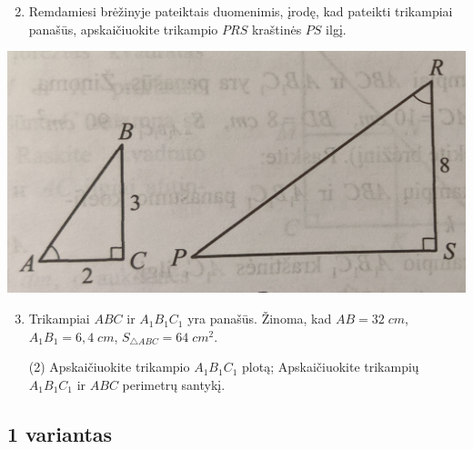 \documentclass[a4paper]{article}
\begin{document}
\begin{minipage}{0.5\textwidth}
      \begin{enumerate}
            \setcounter{enumi}{1} %
            \item Remdamiesi brėžinyje pateiktais duomenimis, įrodę, kad pateikti trikampiai
                  panašūs, apskaičiuokite trikampio $PRS$ kraštinės $PS$ ilgį.
      \end{enumerate}
      \begin{center}
            \includegraphics[scale=0.5]{images/triangle_2.png}
      \end{center}
\end{minipage}

\begin{enumerate}
      \setcounter{enumi}{2} %
      \item Trikampiai $ABC$ ir $A_1B_1C_1$ yra panašūs. Žinoma, kad $AB=32 \; cm$,
            $A_1B_1=6,4 \; cm$, $S_{\triangle ABC}=64 \; cm^2$.
            \begin{tasks}[item-format={\normalfont}, after-item-skip=2mm](2)
                  \task Apskaičiuokite trikampio $A_1B_1C_1$ plotą;
                  \task Apskaičiuokite trikampių $A_1B_1C_1$ ir $ABC$ perimetrų santykį.
            \end{tasks}
\end{enumerate}

\subsection*{1 variantas}
\end{document}
